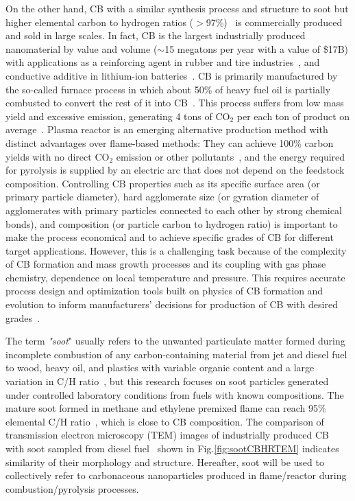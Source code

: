 On the other hand, CB with a similar synthesis process and structure to soot but higher elemental carbon to hydrogen ratios ($>$97\%)~\citep{watson2001carbon} is commercially produced and sold in large scales. In fact, CB is the largest industrially produced nanomaterial by value and volume ($\sim$15 megatons per year with a value of \$17B) with applications as a reinforcing agent in rubber and tire industries~\citep{international2016carbon}, and conductive additive in lithium-ion batteries~\citep{Palomares2010}. CB is primarily manufactured by the so-called furnace process in which about 50\% of heavy fuel oil is partially combusted to convert the rest of it into CB~\citep{pratsinis2011history}. This process suffers from low mass yield and excessive emission, generating 4 tons of $\mathrm{CO_2}$ per each ton of product on average~\citep{bansal1993carbon}. Plasma reactor is an emerging alternative production method with distinct advantages over flame-based methods: They can achieve 100\% carbon yields with no direct $\mathrm{CO_2}$ emission or other pollutants~\citep{cho2004conversion}, and the energy required for pyrolysis is supplied by an electric arc that does not depend on the feedstock composition. Controlling CB properties such as its specific surface area (or primary particle diameter), hard agglomerate size (or gyration diameter of agglomerates with primary particles connected to each other by strong chemical bonds), and composition (or particle carbon to hydrogen ratio) is important to make the process economical and to achieve specific grades of CB for different target applications. However, this is a challenging task because of the complexity of CB formation and mass growth processes and its coupling with gas phase chemistry, dependence on local temperature and pressure. This requires accurate process design and optimization tools built on physics of CB formation and evolution to inform manufacturers' decisions for production of CB with desired grades~\citep{park2005influence}.
 
The term \textit{"soot}" usually refers to the unwanted particulate matter formed during incomplete combustion of any carbon-containing material from jet and diesel fuel to wood, heavy oil, and plastics with variable organic content and a large variation in C/H ratio~\citep{watson2001carbon}, but this research focuses on soot particles generated under controlled laboratory conditions from fuels with known compositions. The mature soot formed in methane and ethylene premixed flame can reach 95\% elemental C/H ratio~\cite{russo2015dehydrogenation}, which is close to CB composition. The comparison of transmission electron microscopy (TEM) images of industrially produced CB~\citep{singh2018nanostructure} with soot sampled from diesel fuel~\citep{vander2007hrtem, lapuerta2017morphological} shown in Fig.\ref{fig:sootCBHRTEM} indicates similarity of their morphology and structure. Hereafter, soot will be used to collectively refer to carbonaceous nanoparticles produced in flame/reactor during combustion/pyrolysis processes.

